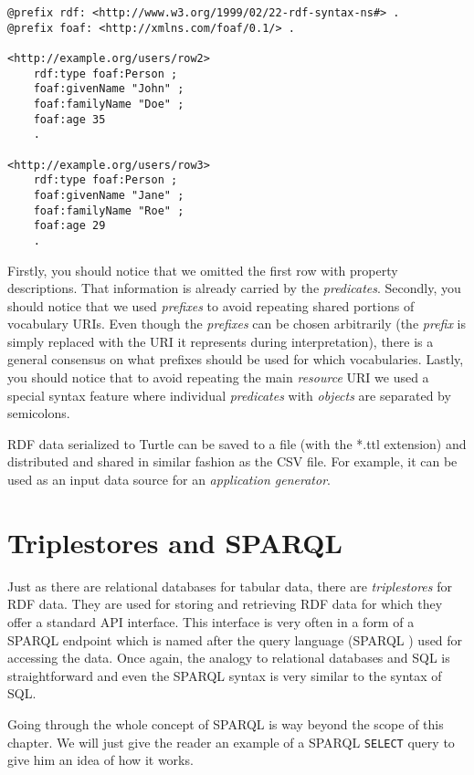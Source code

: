 \begin{verbatim}
@prefix rdf: <http://www.w3.org/1999/02/22-rdf-syntax-ns#> .
@prefix foaf: <http://xmlns.com/foaf/0.1/> .

<http://example.org/users/row2>
    rdf:type foaf:Person ; 
    foaf:givenName "John" ;
    foaf:familyName "Doe" ;
    foaf:age 35
    .
    
<http://example.org/users/row3>
    rdf:type foaf:Person ; 
    foaf:givenName "Jane" ;
    foaf:familyName "Roe" ;
    foaf:age 29
    .
\end{verbatim}

Firstly, you should notice that we omitted the first row with property descriptions. That information is already carried by the \emph{predicates}. Secondly, you should notice that we used \emph{prefixes} to avoid repeating shared portions of vocabulary URIs. Even though the \emph{prefixes} can be chosen arbitrarily (the \emph{prefix} is simply replaced with the URI it represents during interpretation), there is a general consensus on what prefixes should be used for which vocabularies. Lastly, you should notice that to avoid repeating the main \emph{resource} URI we used a special syntax feature where individual \emph{predicates} with \emph{objects} are separated by semicolons.

RDF data serialized to Turtle can be saved to a file (with the *.ttl extension) and distributed and shared in similar fashion as the CSV file. For example, it can be used as an input data source for an \emph{application generator}.

\section{Triplestores and SPARQL}

Just as there are relational databases for tabular data, there are \emph{triplestores} for RDF data. They are used for storing and retrieving RDF data for which they offer a standard API interface. This interface is very often in a form of a SPARQL endpoint which is named after the query language  (SPARQL \cite{sparql}) used for accessing the data. Once again, the analogy to relational databases and SQL is straightforward and even the SPARQL syntax is very similar to the syntax of SQL.

Going through the whole concept of SPARQL is way beyond the scope of this chapter. We will just give the reader an example of a SPARQL \texttt{SELECT} query to give him an idea of how it works.

